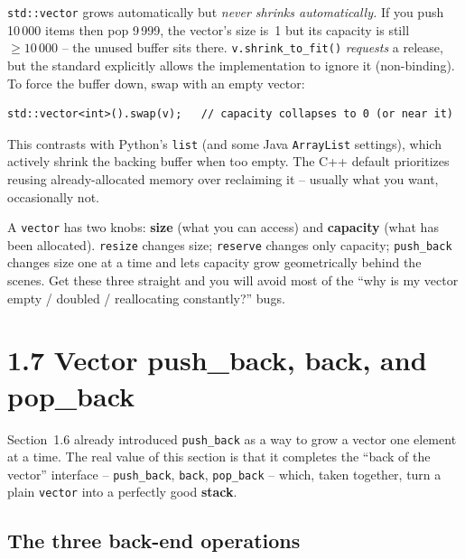 \documentclass[11pt]{article}
\begin{document}
\begin{warnbox}
\texttt{std::vector} grows automatically but \emph{never shrinks
automatically.} If you push 10\,000 items then pop 9\,999, the vector's
size is~1 but its capacity is still $\geq 10\,000$ -- the unused buffer
sits there. \texttt{v.shrink\_to\_fit()} \emph{requests} a release, but
the standard explicitly allows the implementation to ignore it
(non-binding). To force the buffer down, swap with an empty vector:
\begin{lstlisting}
std::vector<int>().swap(v);   // capacity collapses to 0 (or near it)
\end{lstlisting}
This contrasts with Python's \texttt{list} (and some Java
\texttt{ArrayList} settings), which actively shrink the backing buffer
when too empty. The C++ default prioritizes reusing already-allocated
memory over reclaiming it -- usually what you want, occasionally not.
\end{warnbox}

\begin{ideabox}
A \texttt{vector} has two knobs: \textbf{size} (what you can access)
and \textbf{capacity} (what has been allocated). \texttt{resize}
changes size; \texttt{reserve} changes only capacity;
\texttt{push\_back} changes size one at a time and lets capacity
grow geometrically behind the scenes. Get these three straight and
you will avoid most of the ``why is my vector empty / doubled /
reallocating constantly?'' bugs.
\end{ideabox}

\section{1.7 Vector push\_back, back, and pop\_back}

Section~1.6 already introduced \texttt{push\_back} as a way to grow a
vector one element at a time. The real value of this section is that
it completes the ``back of the vector'' interface -- \texttt{push\_back},
\texttt{back}, \texttt{pop\_back} -- which, taken together, turn a
plain \texttt{vector} into a perfectly good \textbf{stack}.

\subsection{The three back-end operations}
\end{document}
